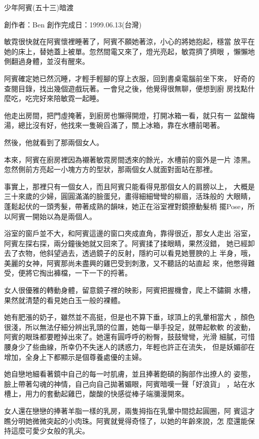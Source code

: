 



少年阿賓(五十三)暗渡

創作者：Ben
創作完成日：1999.06.13(台灣)


敏霓很快就在阿賓懷裡睡著了，阿賓不願她著涼，小心的將她抱起，穩當
放平在她的床上，替她蓋上被單。忽然間電又來了，燈光亮起，敏霓擠了擠眼
，懶懶地側翻過身體，並沒有醒來。

阿賓確定她已然沉睡，才輕手輕腳的穿上衣服，回到書桌電腦前坐下來，
好奇的查閱目錄，找出幾個遊戲玩著。一會兒之後，他覺得很無聊，便想到廚
房找點什麼吃，吃完好來陪敏霓一起睡。

他走出房間，把門虛掩著，到廚房也懶得開燈，打開冰箱一看，就只有一
盆酸梅湯，總比沒有好，他找來一隻碗舀滿了，關上冰箱，靠在水槽前喝著。

然後，他就看到了那兩個女人。

本來，阿賓在廚房裡因為襯著敏霓房間透來的餘光，水槽前的窗外是一片
漆黑。忽然側前方亮起一小塊方方的型狀，那兩個女人就面對面站在那裡。

事實上，那裡只有一個女人，而且阿賓只能看得見那個女人的肩膀以上，
大概是三十來歲的少婦，圓圓滿滿的臉蛋兒，畫得細細彎彎的柳眉，活珠般的
大眼睛，蓬鬆起伏的一頭秀髮，帶著成熟的韻味，她正在浴室裡對鏡撩動髮梢
擺Pose，所以阿賓一開始以為是兩個人。

浴室的窗戶並不大，和阿賓這邊的窗口夾成直角，靠得很近，那女人走出
浴室，阿賓左探右探，兩分鐘後她就又回來了。阿賓揉了揉眼睛，果然沒錯，
她已經卸去了衣物，他斜望過去，透過鏡子的反射，隱約可以看見她豐腴的上
半身，哦，美麗的女神，阿賓那尚未盡興的雞巴受到刺激，又不聽話的站直起
來，他憋得難受，便將它掏出褲檔，一下一下的捋著。

女人很優雅的轉動身體，留意鏡子裡的映影，阿賓把握機會，爬上不鏽鋼
水槽，果然就清楚的看見她白玉一般的裸體。

她有肥漲的奶子，雖然並不高挺，但是也不算下垂，球頂上的乳暈相當大
，顏色很淺，所以無法仔細分辨出乳頭的位置，她每一舉手投足，就帶起軟軟
的波動，阿賓的眼珠都要瞪掉出來了。她還有圓呼呼的粉臀，鼓鼓彎彎，光滑
細膩，可惜腰身少了些曲線，所幸仍不失迷人的誘惑力，年輕也許正在流失，
但是妖媚卻在增加，全身上下都顯示是個尊養處優的主婦。

她自戀地細看著鏡中自己的每一吋肌膚，並且捧著飽碩的胸部作出撩人的
姿態，臉上帶著勾魂的神情，自己向自己拋著媚眼，阿賓暗嘆一聲「好浪貨」
，站在水槽上，用力的套動起雞巴，酸酸的快感從棒子端瀰漫開來。

女人還在戀戀的捧著羊脂一樣的乳房，兩隻拇指在乳暈中間捻起圓圈，阿
賓這才瞧分明她微微突起的小肉珠。阿賓就覺得奇怪了，以她的年齡來說，怎
麼還能保持這麼可愛少女般的乳尖。


